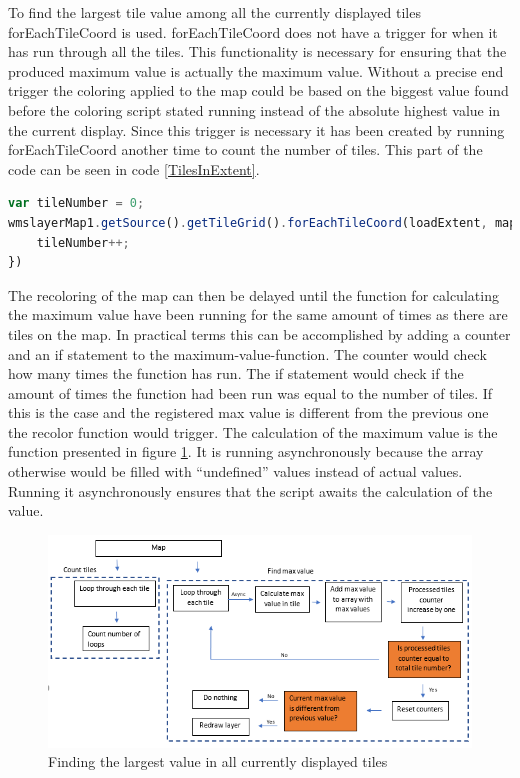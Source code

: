 To find the largest tile value among all the currently displayed tiles forEachTileCoord is used. forEachTileCoord does not have a trigger for when it has run through all the tiles. This functionality is necessary for ensuring that the produced maximum value is actually the maximum value. Without a precise end trigger the coloring applied to the map could be based on the biggest value found before the coloring script stated running instead of the absolute highest value in the current display.
Since this trigger is necessary it has been created by running forEachTileCoord another time to count the number of tiles. This part of the code can be seen in code \ref{TilesInExtent}.
\begin{lstlisting}[language=JavaScript, caption={Counting the amount of tiles within the current extent}, label= TilesInExtent,escapechar=|] 
var tileNumber = 0;
wmslayerMap1.getSource().getTileGrid().forEachTileCoord(loadExtent, mapZoom - zoomlevelAdjustment, function(tileCoord) {
	tileNumber++;
})
\end{lstlisting}
The recoloring of the map can then be delayed until the function for calculating the maximum value have been running for the same amount of times as there are tiles on the map. In practical terms this can be accomplished by adding a counter and an if statement to the maximum-value-function. The counter would check how many times the function has run. The if statement would check if the amount of times the function had been run was equal to the number of tiles. If this is the case and the registered max value is different from the previous one the recolor function would trigger.
The calculation of the maximum value is the function presented in figure \ref{DoubleLoop}. It is running asynchronously because the array otherwise would be filled with “undefined” values instead of actual values. Running it asynchronously ensures that the script awaits the calculation of the value.  
\begin{figure} [H]
	\centering
	\includegraphics[width=.8\textwidth]{Pictures/DoubleLoop}
	\caption{Finding the largest value in all currently displayed tiles}
	\label{DoubleLoop}
\end{figure}

